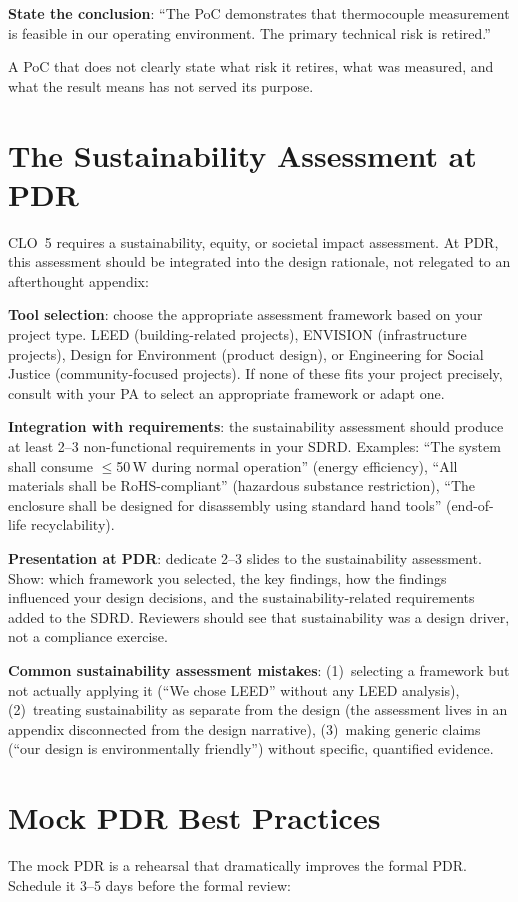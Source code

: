 \textbf{State the conclusion}: ``The PoC demonstrates that thermocouple measurement is feasible in our operating environment. The primary technical risk is retired.''

A PoC that does not clearly state what risk it retires, what was measured, and what the result means has not served its purpose.



\section{The Sustainability Assessment at PDR}
CLO~5 requires a sustainability, equity, or societal impact assessment. At PDR, this assessment should be integrated into the design rationale, not relegated to an afterthought appendix:

\textbf{Tool selection}: choose the appropriate assessment framework based on your project type. LEED (building-related projects), ENVISION (infrastructure projects), Design for Environment (product design), or Engineering for Social Justice (community-focused projects). If none of these fits your project precisely, consult with your PA to select an appropriate framework or adapt one.

\textbf{Integration with requirements}: the sustainability assessment should produce at least 2--3 non-functional requirements in your SDRD. Examples: ``The system shall consume $\leq$50\,W during normal operation'' (energy efficiency), ``All materials shall be RoHS-compliant'' (hazardous substance restriction), ``The enclosure shall be designed for disassembly using standard hand tools'' (end-of-life recyclability).

\textbf{Presentation at PDR}: dedicate 2--3 slides to the sustainability assessment. Show: which framework you selected, the key findings, how the findings influenced your design decisions, and the sustainability-related requirements added to the SDRD. Reviewers should see that sustainability was a design driver, not a compliance exercise.

\textbf{Common sustainability assessment mistakes}: (1)~selecting a framework but not actually applying it (``We chose LEED'' without any LEED analysis), (2)~treating sustainability as separate from the design (the assessment lives in an appendix disconnected from the design narrative), (3)~making generic claims (``our design is environmentally friendly'') without specific, quantified evidence.

\section{Mock PDR Best Practices}
The mock PDR is a rehearsal that dramatically improves the formal PDR. Schedule it 3--5 days before the formal review:

